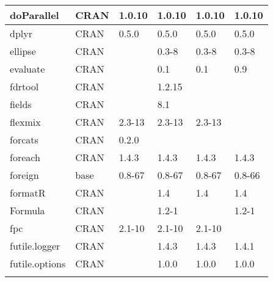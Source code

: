 \begin{longtable}{|llllll|}
doParallel                    & CRAN                      & 1.0.10      & 1.0.10      & 1.0.10         & 1.0.10            \\ \hline \rowcolor{gray!25}
dplyr                         & CRAN                      & 0.5.0       & 0.5.0       & 0.5.0          & 0.5.0            \\ \hline
ellipse                       & CRAN                      &             & 0.3-8       & 0.3-8          & 0.3-8             \\ \hline \rowcolor{gray!25}
evaluate                      & CRAN                      &             & 0.1         & 0.1            & 0.9              \\ \hline
fdrtool                       & CRAN                      &             & 1.2.15      &                &                   \\ \hline \rowcolor{gray!25}
fields                        & CRAN                      &             & 8.1         &                &                  \\ \hline
flexmix                       & CRAN                      & 2.3-13      & 2.3-13      & 2.3-13         &                   \\ \hline \rowcolor{gray!25}
forcats                       & CRAN                      & 0.2.0       &             &                &                  \\ \hline
foreach                       & CRAN                      & 1.4.3       & 1.4.3       & 1.4.3          & 1.4.3             \\ \hline \rowcolor{gray!25}
foreign                       & base                      & 0.8-67      & 0.8-67      & 0.8-67         & 0.8-66           \\ \hline
formatR                       & CRAN                      &             & 1.4         & 1.4            & 1.4               \\ \hline \rowcolor{gray!25}
Formula                       & CRAN                      &             & 1.2-1       &                & 1.2-1            \\ \hline
fpc                           & CRAN                      & 2.1-10      & 2.1-10      & 2.1-10         &                   \\ \hline \rowcolor{gray!25}
futile.logger                 & CRAN                      &             & 1.4.3       & 1.4.3          & 1.4.1            \\ \hline
futile.options                & CRAN                      &             & 1.0.0       & 1.0.0          & 1.0.0             \\ \hline \rowcolor{gray!25}

\end{longtable}
